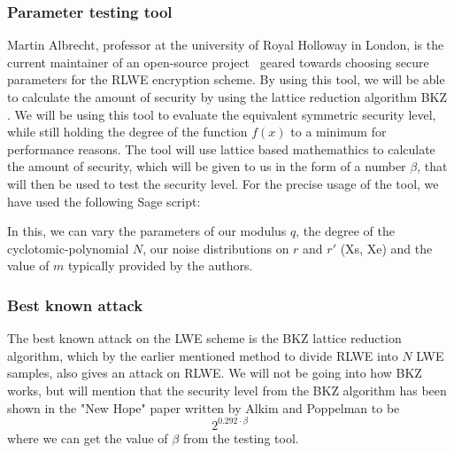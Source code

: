 \documentclass[../main.tex]{subfiles}
\begin{document}
    \subsubsection{Parameter testing tool}
        Martin Albrecht, professor at the university of Royal Holloway in London, is the current maintainer of an
		open-source project~\cite{estimations-tool} geared towards choosing secure parameters for the RLWE encryption scheme.
		By using this tool, we will be able to calculate the amount of security by using the lattice reduction algorithm BKZ \cite{usenix16}.
		We will be using this tool to evaluate the equivalent symmetric security level,
		while still holding the degree of the function $f(x)$ to a minimum for performance reasons.
		The tool will use lattice based mathemathics to calculate the amount of security, which will be given
		to us in the form of a number $\beta$, that will then be used to test the security level.
        For the precise usage of the tool, we have used the following Sage script:
        
        In this, we can vary the parameters of our modulus $q$, the degree of the cyclotomic-polynomial $N$,
        our noise distributions on $r$ and $r'$ (Xs, Xe) and the value of $m$ typically provided by the authors.

    \subsubsection{Best known attack}
		The best known attack on the LWE scheme is the BKZ lattice reduction algorithm, which by the earlier mentioned method to divide RLWE into $N$ LWE samples, also gives an attack on RLWE.
		We will not be going into how BKZ works, but will mention that the security level from the BKZ algorithm
		has been shown in the "New Hope" paper \cite{usenix16} written by Alkim and Poppelman to be
		\[ 2^{0.292 \cdot \beta} \]
		where we can get the value of $\beta$ from the testing tool.
\end{document}
